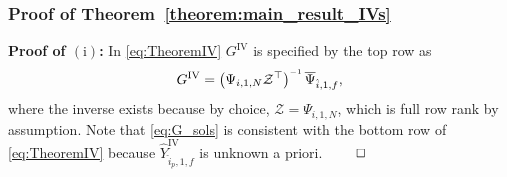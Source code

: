 \subsubsection{Proof of Theorem~\ref{theorem:main_result_IVs}}
\noindent\textbf{Proof of $(\mathrm{i})$:} In \eqref{eq:TheoremIV} $G^\mathrm{IV}$ is specified by the top row as
\begin{align}\label{eq:G_sols}
    G^\mathrm{IV} = \left(\Psi_{i,1,N}\mathcal{Z}^\top\right)\inv\overline{\Psi}_{\hat{i},1,f},
\end{align}
where the inverse exists because by choice, $\mathcal{Z}=\Psi_{i,1,N}$, which is full row rank by assumption. Note that \eqref{eq:G_sols} is consistent with the bottom row of \eqref{eq:TheoremIV} because $\widehat{Y}_{\hat{i}_p,1,f}^\mathrm{IV}$ is unknown a priori. $\hfill\qed$
% 


